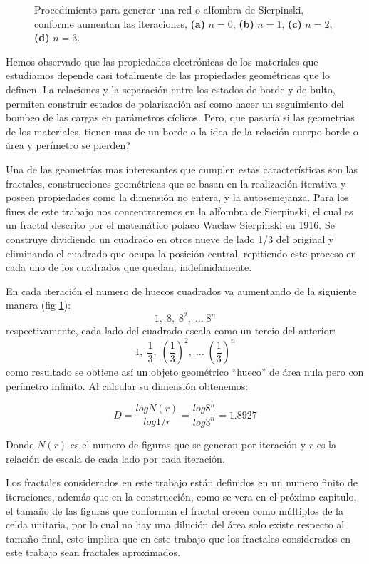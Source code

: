 \begin{figure}[tbh!]
\begin{subfigure}[b!]{0.25 \textwidth}
     \end{subfigure}
        \caption{Procedimiento para generar una red o alfombra de Sierpinski, conforme aumentan las iteraciones, \textbf{(a)} $n=0$, \textbf{(b)} $n=1$, \textbf{(c)} $n=2$,\textbf{(d)} $n=3$.}
        \label{fig:Fractals}
\end{figure}

Hemos observado que las propiedades electrónicas de los materiales que estudiamos depende casi totalmente de las propiedades geométricas que lo definen. La relaciones y la separación entre los estados de borde y de bulto, permiten construir estados de polarización así como hacer un seguimiento del bombeo de las cargas en parámetros cíclicos. Pero, que pasaría si las geometrías de los materiales, tienen mas de un borde o la idea de la relación cuerpo-borde o área y perímetro se pierden? 

Una de las geometrías mas interesantes que cumplen estas características son las fractales, construcciones geométricas que se basan en la realización iterativa y poseen propiedades como la dimensión no entera, y la autosemejanza. Para los fines de este trabajo nos concentraremos en la alfombra de Sierpinski, el cual es un fractal descrito por el matemático polaco Waclaw Sierpinski en 1916. Se construye dividiendo un cuadrado en otros nueve de lado 1/3 del original y eliminando el cuadrado que ocupa la posición central, repitiendo este proceso en cada uno de los cuadrados que
quedan, indefinidamente.

En cada iteración el numero de huecos cuadrados va aumentando de la siguiente manera (fig \ref{fig:Fractals}):
\begin{equation}
    1,\; 8, \; 8^2,\;\dots\; 8^n
\end{equation}
respectivamente, cada lado del cuadrado escala como un tercio del anterior:
\begin{equation}
    1,\; \frac{1}{3}, \; \left( \frac{1}{3} \right)^2,\;\dots\; \left( \frac{1}{3} \right)^n
\end{equation}
como resultado se obtiene así un objeto geométrico “hueco” de área nula pero con perímetro infinito. Al calcular su dimensión obtenemos:

\begin{equation}
    D = \frac{log N(r)}{log 1/r} = \frac{log 8^n}{log 3^n} = 1.8927
\end{equation}

Donde $N(r)$ es el numero de figuras que se generan por iteración y $r$ es la relación de escala de cada lado por cada iteración.

Los fractales considerados en este trabajo están definidos en un numero finito de iteraciones, además que en la construcción, como se vera en el próximo capitulo, el tamaño de las figuras que conforman el fractal crecen como múltiplos de la celda unitaria, por lo cual no hay una dilución del área solo existe respecto al tamaño final, esto implica que en este trabajo que los fractales considerados en este trabajo sean fractales aproximados.

